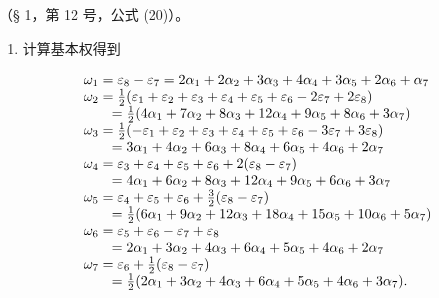 （§ 1，第 12 号，公式 (20)）。

\begin{enumerate}
\def\labelenumi{(\Roman{enumi})}
\setcounter{enumi}{5}
\tightlist
\item
  计算基本权得到
\end{enumerate}

\[
\begin{array}{r l} & {\omega_ {1} = \varepsilon_ {8} - \varepsilon_ {7} = 2 \alpha_ {1} + 2 \alpha_ {2} + 3 \alpha_ {3} + 4 \alpha_ {4} + 3 \alpha_ {5} + 2 \alpha_ {6} + \alpha_ {7}} \\ & {\omega_ {2} = \frac {1}{2} (\varepsilon_ {1} + \varepsilon_ {2} + \varepsilon_ {3} + \varepsilon_ {4} + \varepsilon_ {5} + \varepsilon_ {6} - 2 \varepsilon_ {7} + 2 \varepsilon_ {8})} \\ & {\qquad = \frac {1}{2} (4 \alpha_ {1} + 7 \alpha_ {2} + 8 \alpha_ {3} + 12 \alpha_ {4} + 9 \alpha_ {5} + 8 \alpha_ {6} + 3 \alpha_ {7})} \\ & {\omega_ {3} = \frac {1}{2} (- \varepsilon_ {1} + \varepsilon_ {2} + \varepsilon_ {3} + \varepsilon_ {4} + \varepsilon_ {5} + \varepsilon_ {6} - 3 \varepsilon_ {7} + 3 \varepsilon_ {8})} \\ & {\qquad = 3 \alpha_ {1} + 4 \alpha_ {2} + 6 \alpha_ {3} + 8 \alpha_ {4} + 6 \alpha_ {5} + 4 \alpha_ {6} + 2 \alpha_ {7}} \\ & {\omega_ {4} = \varepsilon_ {3} + \varepsilon_ {4} + \varepsilon_ {5} + \varepsilon_ {6} + 2 (\varepsilon_ {8} - \varepsilon_ {7})} \\ & {\qquad = 4 \alpha_ {1} + 6 \alpha_ {2} + 8 \alpha_ {3} + 12 \alpha_ {4} + 9 \alpha_ {5} + 6 \alpha_ {6} + 3 \alpha_ {7}} \\ & {\omega_ {5} = \varepsilon_ {4} + \varepsilon_ {5} + \varepsilon_ {6} + \frac {3}{2} (\varepsilon_ {8} - \varepsilon_ {7})} \\ & {\qquad = \frac {1}{2} (6 \alpha_ {1} + 9 \alpha_ {2} + 12 \alpha_ {3} + 18 \alpha_ {4} + 15 \alpha_ {5} + 10 \alpha_ {6} + 5 \alpha_ {7})} \\ & {\omega_ {6} = \varepsilon_ {5} + \varepsilon_ {6} - \varepsilon_ {7} + \varepsilon_ {8}} \\ & {\qquad = 2 \alpha_ {1} + 3 \alpha_ {2} + 4 \alpha_ {3} + 6 \alpha_ {4} + 5 \alpha_ {5} + 4 \alpha_ {6} + 2 \alpha_ {7}} \\ & {\omega_ {7} = \varepsilon_ {6} + \frac {1}{2} (\varepsilon_ {8} - \varepsilon_ {7})} \\ & {\qquad = \frac {1}{2} (2 \alpha_ {1} + 3 \alpha_ {2} + 4 \alpha_ {3} + 6 \alpha_ {4} + 5 \alpha_ {5} + 4 \alpha_ {6} + 3 \alpha_ {7}).} \end{array}
\]

